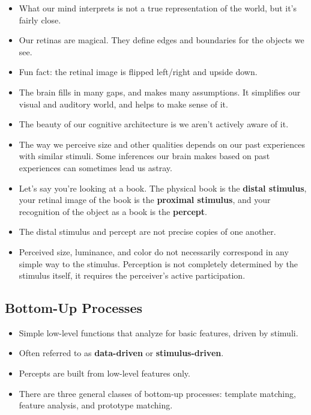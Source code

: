 \documentclass[]{article}
\begin{document}
		\begin{itemize}
			\item What our mind interprets is not a true representation of the world, but it's fairly close.
			\item Our retinas are magical. They define edges and boundaries for the objects we see.
			\item Fun fact: the retinal image is flipped left/right and upside down.
			\item The brain fills in many gaps, and makes many assumptions. It simplifies our visual and auditory world, and helps to make sense of it.
			\item The beauty of our cognitive architecture is we aren't actively aware of it.
			\item The way we perceive size and other qualities depends on our past experiences with similar stimuli. Some inferences our brain makes based on past experiences can sometimes lead us astray.
			\item Let's say you're looking at a book. The physical book is the \textbf{distal stimulus}, your retinal image of the book is the \textbf{proximal stimulus}, and your recognition of the object as a book is the \textbf{percept}.
			\item The distal stimulus and percept are not precise copies of one another.
			\item Perceived size, luminance, and color do not necessarily correspond in any simple way to the stimulus. Perception is not completely determined by the stimulus itself, it requires the perceiver's active participation.
		\end{itemize}

		\subsection{Bottom-Up Processes}
			\begin{itemize}
				\item Simple low-level functions that analyze for basic features, driven by stimuli.
				\item Often referred to as \textbf{data-driven} or \textbf{stimulus-driven}.
				\item Percepts are built from low-level features only.
				\item There are three general classes of bottom-up processes: template matching, feature analysis, and prototype matching.
			\end{itemize}
			
\end{document}
